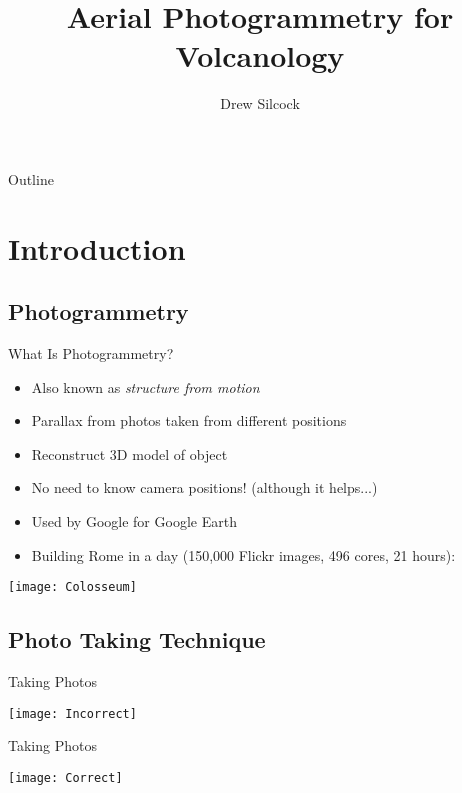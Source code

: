 \documentclass[table]{beamer}
\title{Aerial Photogrammetry for Volcanology} %
\author{Drew Silcock}
\institute{University of Bristol, Department of Earth Sciences}
\begin{document}
\begin{frame}
    \titlepage
\end{frame}

\begin{frame}{Outline}
    \tableofcontents
\end{frame}

\section{Introduction}

\subsection{Photogrammetry}

\begin{frame}{What Is Photogrammetry?}
    \begin{itemize}
        \item Also known as \textit{structure from motion}
        \item Parallax from photos taken from different positions
        \item Reconstruct 3D model of object
        \item No need to know camera positions! (although it helps...)
        \item Used by Google for Google Earth
        \item Building Rome in a day (150,000 Flickr images, 496 cores, 21
            hours):
    \end{itemize}
    \begin{center}
        \texttt{[image: Colosseum]}
    \end{center}
\end{frame}

\subsection{Photo Taking Technique}

\begin{frame}{Taking Photos}
    \begin{center}
        \texttt{[image: Incorrect]}
    \end{center}
\end{frame}

\begin{frame}{Taking Photos}
    \begin{center}
        \texttt{[image: Correct]}
    \end{center}
\end{frame}
\end{document}
